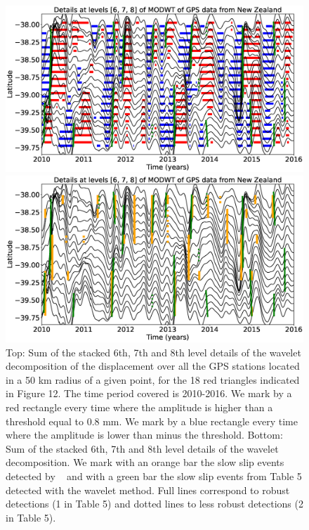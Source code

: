 \documentclass{article}
\begin{document}
\begin{figure}
\noindent\includegraphics[width=\textwidth, trim={0cm 0cm 0cm 0cm},clip]{figures/GPS_NZ_details_6-7-8.eps}

\noindent\includegraphics[width=\textwidth, trim={0cm 0cm 0cm 0cm},clip]{figures/GPS_NZ_details_6-7-8_events.eps}
\caption{Top: Sum of the stacked 6th, 7th and 8th level details of the wavelet decomposition of the displacement over all the GPS stations located in a 50 km radius of a given point, for the 18 red triangles indicated in Figure 12. The time period covered is 2010-2016. We mark by a red rectangle every time where the amplitude is higher than a threshold equal to 0.8 mm. We mark by a blue rectangle every time where the amplitude is lower than minus the threshold. Bottom: Sum of the stacked 6th, 7th and 8th level details of the wavelet decomposition. We mark with an orange bar the slow slip events detected by ~\citet{TOD_2016} and with a green bar the slow slip events from Table 5 detected with the wavelet method. Full lines correspond to robust detections (1 in Table 5) and dotted lines to less robust detections (2 in Table 5).}
\label{pngfiguresample}
\end{figure}
\end{document}
